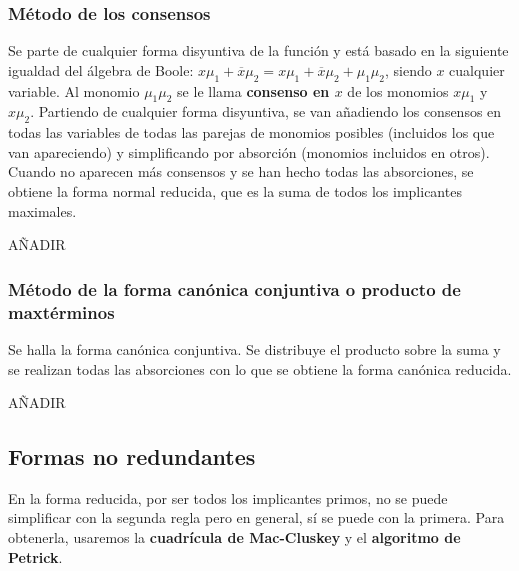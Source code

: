 \subsubsection{Método de los consensos}
Se parte de cualquier forma disyuntiva de la función y está basado en la siguiente igualdad del álgebra de Boole: $x\mu_1 + \overline{x}\mu_2 = x\mu_1 + \overline{x}\mu_2 + \mu_1\mu_2$, siendo $x$ cualquier variable.
Al monomio $\mu_1\mu_2$ se le llama \textbf{consenso en $x$} de los monomios $x\mu_1$ y $x\mu_2$. \smallskip
Partiendo de cualquier forma disyuntiva, se van añadiendo los consensos en todas las variables de todas las parejas de monomios posibles (incluidos los que van apareciendo) y simplificando por absorción (monomios incluidos en otros).
Cuando no aparecen más consensos y se han hecho todas las absorciones, se obtiene la forma normal reducida, que es la suma de todos los implicantes maximales.
\begin{ejemplo}
    AÑADIR
\end{ejemplo}

\subsubsection{Método de la forma canónica conjuntiva o producto de maxtérminos}
Se halla la forma canónica conjuntiva. Se distribuye el producto sobre la suma y se realizan todas las absorciones con lo que se obtiene la forma canónica reducida.
\begin{ejemplo}
    AÑADIR
\end{ejemplo}

\subsection{Formas no redundantes}
En la forma reducida, por ser todos los implicantes primos, no se puede simplificar con la segunda regla pero en general, sí se puede con la primera. Para obtenerla, usaremos la \textbf{cuadrícula de Mac-Cluskey} y el \textbf{algoritmo de Petrick}.
